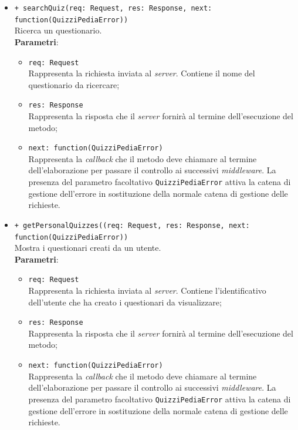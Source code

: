 \begin{itemize}
\begin{itemize}
		\item \texttt{+ searchQuiz(req: Request, res: Response, next: function(QuizziPediaError))}\\
		Ricerca un questionario.\\
		\textbf{Parametri}:
		\begin{itemize}
			\item \texttt{req: Request}\\
			Rappresenta la richiesta inviata al \textit{server}. Contiene il nome del questionario da ricercare;
			\item \texttt{res: Response}\\
			Rappresenta la risposta che il \textit{server} fornirà al termine dell'esecuzione del metodo;
			\item \texttt{next: function(QuizziPediaError)}\\
			Rappresenta la \textit{callback} che il metodo deve chiamare al termine dell'elaborazione per passare il controllo ai successivi \textit{middleware}. La presenza del parametro facoltativo \texttt{QuizziPediaError} attiva la catena di gestione dell'errore in sostituzione della normale catena di gestione delle richieste.
		\end{itemize}
		
		\item \texttt{+ getPersonalQuizzes((req: Request, res: Response, next: function(QuizziPediaError))}\\
			Mostra i questionari creati da un utente.\\
			\textbf{Parametri}:
			\begin{itemize}
				\item \texttt{req: Request}\\
			Rappresenta la richiesta inviata al \textit{server}. Contiene l'identificativo dell'utente che ha creato i questionari da visualizzare;
				\item \texttt{res: Response}\\
			Rappresenta la risposta che il \textit{server} fornirà al termine dell'esecuzione del metodo;
				\item \texttt{next: function(QuizziPediaError)}\\
			Rappresenta la \textit{callback} che il metodo deve chiamare al termine dell'elaborazione per passare il controllo ai successivi \textit{middleware}. La presenza del parametro facoltativo \texttt{QuizziPediaError} attiva la catena di gestione dell'errore in sostituzione della normale catena di gestione delle richieste.
			\end{itemize}
			

\end{itemize}
\end{itemize}
